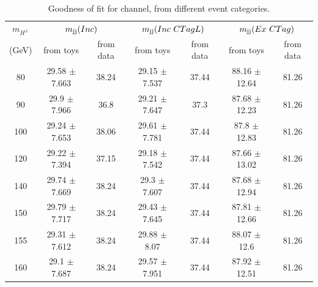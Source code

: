 \begin{table}
\caption{Goodness of fit for \ejets channel, from different event categories.}
\label{tab:gofEle}
\centering
\begin{adjustbox}{max width=\textwidth}
\begin{tabular}{ ccccccc}
\hline
\hline
\multicolumn{1}{c}{{\bf{$m_{H^\pm}$}}} & \multicolumn{2}{c}{$m_\text{jj}(Inc)$} & \multicolumn{2}{c}{$m_\text{jj}(Inc ~CTagL)$} & \multicolumn{2}{c}{$m_\text{jj}(Ex ~CTag)$} \\

(GeV) & from toys & from data & from toys & from data & from toys & from data  \\
 \hline
\hline
80  & 29.58 $\pm$ 7.663 & 38.24 & 29.15 $\pm$ 7.537 & 37.44 & 88.16 $\pm$ 12.64 & 81.26\\
  
90  & 29.9 $\pm$ 7.966 & 36.8 & 29.21 $\pm$ 7.647 & 37.3 & 87.68 $\pm$ 12.23 & 81.26\\
  
100  & 29.24 $\pm$ 7.653 & 38.06 & 29.61 $\pm$ 7.781 & 37.44 & 87.8 $\pm$ 12.83 & 81.26\\
  
120  & 29.22 $\pm$ 7.394 & 37.15 & 29.18 $\pm$ 7.542 & 37.44 & 87.66 $\pm$ 13.02 & 81.26\\
  
140  & 29.74 $\pm$ 7.669 & 38.24 & 29.3 $\pm$ 7.607 & 37.44 & 87.68 $\pm$ 12.94 & 81.26\\
  
150  & 29.79 $\pm$ 7.717 & 38.24 & 29.43 $\pm$ 7.645 & 37.44 & 87.81 $\pm$ 12.66 & 81.26\\
  
155  & 29.31 $\pm$ 7.612 & 38.24 & 29.88 $\pm$ 8.07 & 37.44 & 88.07 $\pm$ 12.6 & 81.26\\
  
160  & 29.1 $\pm$ 7.687 & 38.24 & 29.57 $\pm$ 7.951 & 37.44 & 87.92 $\pm$ 12.51 & 81.26\\
\hline
\end{tabular}
\end{adjustbox}
\end{table}

